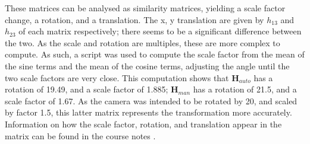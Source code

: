 \documentclass[a4paper, 10pt, conference]{ieeeconf}
\begin{document}
These matrices can be analysed as similarity matrices, yielding a scale factor change, a rotation, and a translation. The x, y translation are given by $h_{13}$ and $h_{23}$ of each matrix respectively; there seems to be a significant difference between the two. As the scale and rotation are multiples, these are more complex to compute. As such, a script was used to compute the scale factor from the mean of the sine terms and the mean of the cosine terms, adjusting the angle until the two scale factors are very close. This computation shows that $\textbf{H}_{auto}$ has a rotation of 19.49\degree, and a scale factor of 1.885; $\textbf{H}_{man}$ has a rotation of 21.5\degree, and a scale factor of 1.67. As the camera was intended to be rotated by 20\degree, and scaled by factor 1.5, this latter matrix represents the transformation more accurately. Information on how the scale factor, rotation, and translation appear in the matrix can be found in the course notes \cite{notes}.
\end{document}
